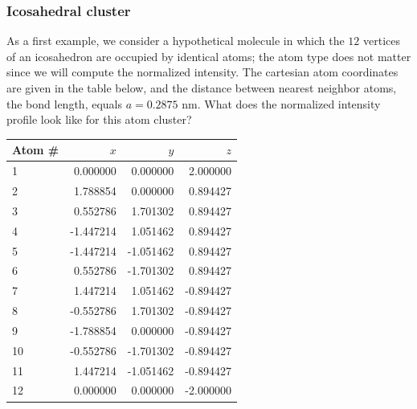 \subsubsection{Icosahedral cluster}\label{\chabbr:ssec:ico}

As a first example, we consider a hypothetical molecule in which the $12$ vertices of an icosahedron are occupied by identical atoms;  the atom type does not matter since we will compute the normalized intensity.  The cartesian atom coordinates are given in the table below, and the distance between nearest neighbor atoms, the bond length, equals $a=0.2875$ nm.  What does the normalized intensity profile look like for this atom cluster?

	\begin{table}[h]
	\centering\leavevmode
	\begin{tabular}{l|rrr}
	Atom \# & $x$ & $y$ & $z$ \\
	\hline
1&0.000000&0.000000&2.000000\\
2&1.788854&0.000000&0.894427\\
3&0.552786&1.701302&0.894427\\
4&-1.447214&1.051462&0.894427\\
5&-1.447214&-1.051462&0.894427\\
6&0.552786&-1.701302&0.894427\\
7&1.447214&1.051462&-0.894427\\
8&-0.552786&1.701302&-0.894427\\
9&-1.788854&0.000000&-0.894427\\
10&-0.552786&-1.701302&-0.894427\\
11&1.447214&-1.051462&-0.894427\\
12&0.000000&0.000000&-2.000000
	\end{tabular}
	\end{table}

